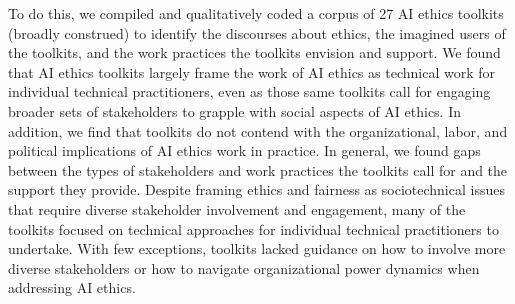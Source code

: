 \documentclass[acmsmall]{acmart}
\begin{document}
To do this, we compiled and qualitatively coded a corpus of 27 AI ethics toolkits (broadly construed) to identify the discourses about ethics, the imagined users of the toolkits, and the work practices the toolkits envision and support. We found that AI ethics toolkits largely frame the work of AI ethics as technical work for individual technical practitioners, even as those same toolkits call for engaging broader sets of stakeholders to grapple with social aspects of AI ethics. In addition, we find that toolkits do not contend with the organizational, labor, and political implications of AI ethics work in practice.  In general, we found gaps between the types of stakeholders and work practices the toolkits call for and the support they provide. Despite framing ethics and fairness as sociotechnical issues that require diverse stakeholder involvement and engagement, many of the toolkits focused on technical approaches for individual technical practitioners to undertake. With few exceptions, toolkits lacked guidance on how to involve more diverse stakeholders or how to navigate organizational power dynamics when addressing AI ethics. %

\end{document}

